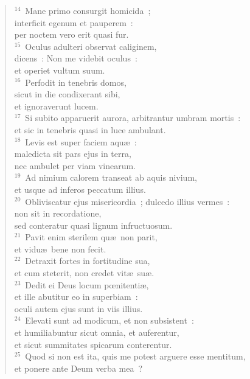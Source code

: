 \begin{flushleft}
\begin{verse}
${}^{14}$~Mane primo consurgit homicida~;\\ interficit egenum et pauperem~:\\ per noctem vero erit quasi fur.\\
${}^{15}$~Oculus adulteri observat caliginem,\\ dicens~: Non me videbit oculus~:\\ et operiet vultum suum.\\
${}^{16}$~Perfodit in tenebris domos,\\ sicut in die condixerant sibi,\\ et ignoraverunt lucem.\\
${}^{17}$~Si subito apparuerit aurora, arbitrantur umbram mortis~:\\ et sic in tenebris quasi in luce ambulant.\\
${}^{18}$~Levis est super faciem aqu\ae~:\\ maledicta sit pars ejus in terra,\\ nec ambulet per viam vinearum.\\
${}^{19}$~Ad nimium calorem transeat ab aquis nivium,\\ et usque ad inferos peccatum illius.\\
${}^{20}$~Obliviscatur ejus misericordia~; dulcedo illius vermes~:\\ non sit in recordatione,\\ sed conteratur quasi lignum infructuosum.\\
${}^{21}$~Pavit enim sterilem qu\ae\ non parit,\\ et vidu\ae\ bene non fecit.\\
${}^{22}$~Detraxit fortes in fortitudine sua,\\ et cum steterit, non credet vit\ae\ su\ae .\\
${}^{23}$~Dedit ei Deus locum pœnitenti\ae ,\\ et ille abutitur eo in superbiam~:\\ oculi autem ejus sunt in viis illius.\\
${}^{24}$~Elevati sunt ad modicum, et non subsistent~:\\ et humiliabuntur sicut omnia, et auferentur,\\ et sicut summitates spicarum conterentur.\\
${}^{25}$~Quod si non est ita, quis me potest arguere esse mentitum,\\ et ponere ante Deum verba mea~?\end{verse}\end{flushleft}


